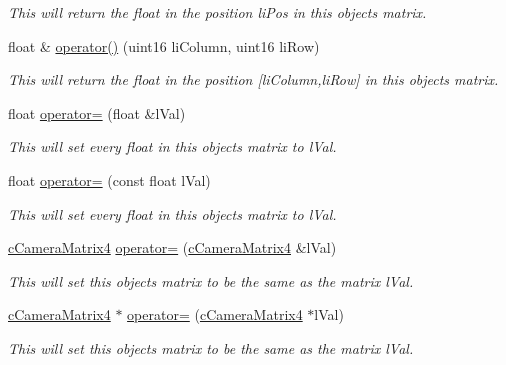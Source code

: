 \begin{DoxyCompactItemize}
\begin{DoxyCompactList}\small\item\em This will return the float in the position liPos in this objects matrix. \item\end{DoxyCompactList}\item 
float \& \hyperlink{classc_camera_matrix4_aeae4d353c1153e9eb15461eac399a29f}{operator()} (uint16 liColumn, uint16 liRow)
\begin{DoxyCompactList}\small\item\em This will return the float in the position \mbox{[}liColumn,liRow\mbox{]} in this objects matrix. \item\end{DoxyCompactList}\item 
float \hyperlink{classc_camera_matrix4_a21020ff4493a379b107a98c8a699d5f7}{operator=} (float \&lVal)
\begin{DoxyCompactList}\small\item\em This will set every float in this objects matrix to lVal. \item\end{DoxyCompactList}\item 
float \hyperlink{classc_camera_matrix4_a13c2e801ef13951525908a0985cf2ba7}{operator=} (const float lVal)
\begin{DoxyCompactList}\small\item\em This will set every float in this objects matrix to lVal. \item\end{DoxyCompactList}\item 
\hyperlink{classc_camera_matrix4}{cCameraMatrix4} \hyperlink{classc_camera_matrix4_a570900cf46a3c6e8a31e957a4dd24103}{operator=} (\hyperlink{classc_camera_matrix4}{cCameraMatrix4} \&lVal)
\begin{DoxyCompactList}\small\item\em This will set this objects matrix to be the same as the matrix lVal. \item\end{DoxyCompactList}\item 
\hyperlink{classc_camera_matrix4}{cCameraMatrix4} $\ast$ \hyperlink{classc_camera_matrix4_aabdb9adddb777e59ae8594cb62b0e02e}{operator=} (\hyperlink{classc_camera_matrix4}{cCameraMatrix4} $\ast$lVal)
\begin{DoxyCompactList}\small\item\em This will set this objects matrix to be the same as the matrix lVal. \item\end{DoxyCompactList}\item 

\end{DoxyCompactItemize}
